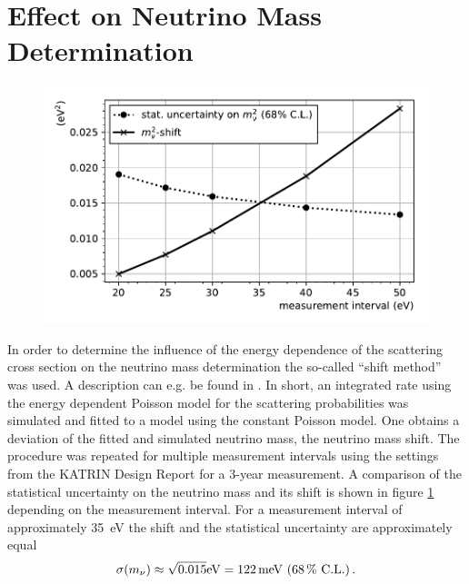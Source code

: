 \section{Effect on Neutrino Mass Determination}
\begin{figure}[t]
\includegraphics[width=\textwidth]{chapter/energyDependentCrossSec/fig/effectOnNuMass.pdf}
        \label{fig:energyDepCrossSecEffectOnNuMass}
\end{figure}
In order to determine the influence of the energy dependence of the scattering cross section on the neutrino mass determination the so-called ``shift method'' was used. A description can e.g. be found in \cite{SeitzM2019}. In short, an integrated rate using the energy dependent Poisson model for the scattering probabilities was simulated and fitted to a model using the constant Poisson model. One obtains a deviation of the fitted and simulated neutrino mass, the neutrino mass shift. The procedure was repeated for multiple measurement intervals using the settings from the KATRIN Design Report \cite{Angrik:2005ep} for a 3-year measurement. A comparison of the statistical uncertainty on the neutrino mass and its shift is shown in figure \ref{fig:energyDepCrossSecEffectOnNuMass} depending on the measurement interval. For a measurement interval of approximately \SI{35}{eV} the shift and the statistical uncertainty are approximately equal
\begin{equation}
    \sigma(m_\nu) \approx 
    \sqrt{0.015}\SI{}{eV} = \SI{122}{meV} 
    \text{ (\SI{68}{\percent} C.L.)}
    \text{\,.}
\end{equation}

